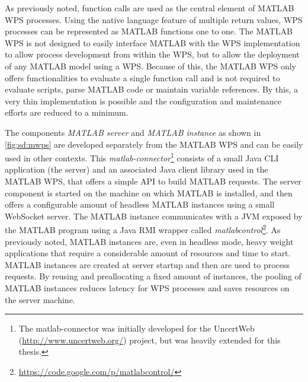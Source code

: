     As previously noted, function calls are used as the central element of MATLAB WPS processes. Using the native language feature of multiple return values, WPS processes can be represented as MATLAB functions one to one. The MATLAB WPS is not designed to easily interface MATLAB with the WPS implementation to allow process development from within the WPS, but to allow the deployment of any MATLAB model using a WPS. Because of this, the MATLAB WPS only offers functionalities to evaluate a single function call and is not required to evaluate scripts, parse MATLAB code or maintain variable references. By this, a very thin implementation is possible and the configuration and maintenance efforts are reduced to a minimum.

    The components \emph{MATLAB server} and \emph{MATLAB instance} as shown in \cref{fig:sd:mwps} are developed separately from the MATLAB WPS and can be easily used in other contexts. This \emph{matlab-connector}\footnote{The matlab-connector was initially developed for the UncertWeb (\url{http://www.uncertweb.org/}) project, but was heavily extended for this thesis.} consists of a small Java CLI application (the server) and an associated Java client library used in the MATLAB WPS, that offers a simple \ac{API} to build MATLAB requests. The server component is started on the machine on which MATLAB is installed, and then offers a configurable amount of headless MATLAB instances using a small WebSocket server. The MATLAB instance communicates with a \ac{JVM} exposed by the MATLAB program using a Java \ac{RMI} wrapper called \emph{matlabcontrol}\footnote{\url{https://code.google.com/p/matlabcontrol/}}. As previously noted, MATLAB instances are, even in headless mode, heavy weight applications that require a considerable amount of resources and time to start. MATLAB instances are created at server startup and then are used to process requests. By reusing and preallocating a fixed amount of instances, the pooling of MATLAB instances reduces latency for WPS processes and saves resources on the server machine.

